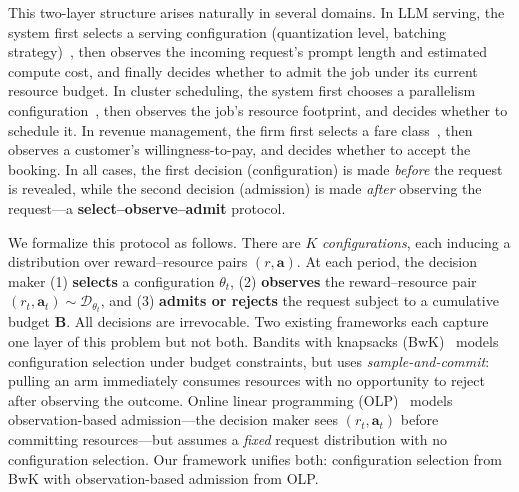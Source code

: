 \documentclass[11pt]{article}
\newcommand{\bB}{\mathbf{B}}
\newcommand{\ba}{\mathbf{a}}
\newcommand{\cD}{\mathcal{D}}
\begin{document}
This two-layer structure arises naturally in several domains. In LLM serving, the system first selects a serving configuration (quantization level, batching strategy)~\citep{kwon2023efficient,yu2022orca}, then observes the incoming request's prompt length and estimated compute cost, and finally decides whether to admit the job under its current resource budget. In cluster scheduling, the system first chooses a parallelism configuration~\citep{gu2019tiresias,narayanan2020heterogeneity,qiao2021pollux}, then observes the job's resource footprint, and decides whether to schedule it. In revenue management, the firm first selects a fare class~\citep{talluri2004theory,gallego1994optimal}, then observes a customer's willingness-to-pay, and decides whether to accept the booking. In all cases, the first decision (configuration) is made \emph{before} the request is revealed, while the second decision (admission) is made \emph{after} observing the request---a \textbf{select--observe--admit} protocol.

We formalize this protocol as follows. There are $K$ \emph{configurations}, each inducing a distribution over reward--resource pairs $(r, \ba)$. At each period, the decision maker (1) \textbf{selects} a configuration $\theta_t$, (2) \textbf{observes} the reward--resource pair $(r_t, \ba_t) \sim \cD_{\theta_t}$, and (3) \textbf{admits or rejects} the request subject to a cumulative budget $\bB$. All decisions are irrevocable. Two existing frameworks each capture one layer of this problem but not both. Bandits with knapsacks (BwK)~\citep{badanidiyuru2018bandits} models configuration selection under budget constraints, but uses \emph{sample-and-commit}: pulling an arm immediately consumes resources with no opportunity to reject after observing the outcome. Online linear programming (OLP)~\citep{Agrawal2014,li2022online} models observation-based admission---the decision maker sees $(r_t, \ba_t)$ before committing resources---but assumes a \emph{fixed} request distribution with no configuration selection. Our framework unifies both: configuration selection from BwK with observation-based admission from OLP. 
\end{document}
